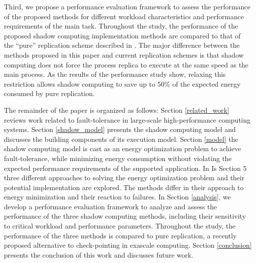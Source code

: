 Third, we propose a performance evaluation framework to assess the
performance of the proposed methods for different workload
characteristics and performance requirements of the main
task. Throughout the study, the performance of the proposed shadow
computing implementation methods are compared to that of the ``pure''
replication scheme described in
\cite{ferreira_hpc_2011}. The major difference between the methods
proposed in this paper and current replication schemes is that shadow
computing does not force the process replica to execute at the same
speed as the main process. As the results of the performance study
show, relaxing this restriction allows shadow computing to save up to
50\% of the expected energy consumed by pure replication.

The remainder of the paper is organized as follows: Section
\ref{related_work} reviews work related to fault-tolerance in
large-scale high-performance computing systems. Section
\ref{shadow_model} presents the shadow computing model and discusses
the building components of its execution model. Section \ref{model}
the shadow computing model is cast as an energy optimization problem
to achieve fault-tolerance, while minimizing energy consumption
without violating the expected performance requirements of the
supported application. In Is Section 5 three different approaches to
solving the energy optimization problem and their potential
implementation are explored. The methods differ in their approach to
energy minimization and their reaction to failures. In Section
\ref{analysis}, we develop a performance evaluation framework to
analyze and assess the performance of the three shadow computing
methods, including their sensitivity to critical workload and
performance parameters.  Throughout the study, the performance of the
three methods is compared to pure replication, a recently proposed
alternative to check-pointing in exascale computing.  Section
\ref{conclusion} presents the conclusion of this work and discusses
future work.
